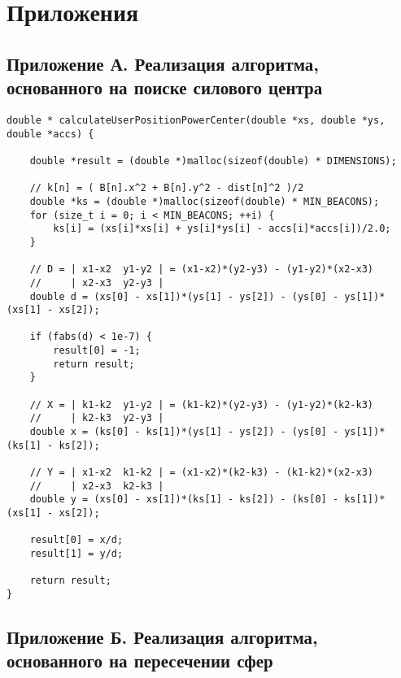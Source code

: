 \section*{Приложения}

\lstset{basicstyle=\footnotesize \ttfamily}
\lstset{language=C, breakindent=40pt, breaklines=true}

\subsection*{Приложение А. Реализация алгоритма, основанного на поиске силового центра}

\begin{lstlisting}
double * calculateUserPositionPowerCenter(double *xs, double *ys, double *accs) {

    double *result = (double *)malloc(sizeof(double) * DIMENSIONS);

    // k[n] = ( B[n].x^2 + B[n].y^2 - dist[n]^2 )/2
    double *ks = (double *)malloc(sizeof(double) * MIN_BEACONS);
    for (size_t i = 0; i < MIN_BEACONS; ++i) {
        ks[i] = (xs[i]*xs[i] + ys[i]*ys[i] - accs[i]*accs[i])/2.0;
    }
    
    // D = | x1-x2  y1-y2 | = (x1-x2)*(y2-y3) - (y1-y2)*(x2-x3)
    //     | x2-x3  y2-y3 |
    double d = (xs[0] - xs[1])*(ys[1] - ys[2]) - (ys[0] - ys[1])*(xs[1] - xs[2]);
    
    if (fabs(d) < 1e-7) {
        result[0] = -1;
        return result;
    }
    
    // X = | k1-k2  y1-y2 | = (k1-k2)*(y2-y3) - (y1-y2)*(k2-k3)
    //     | k2-k3  y2-y3 |
    double x = (ks[0] - ks[1])*(ys[1] - ys[2]) - (ys[0] - ys[1])*(ks[1] - ks[2]);
    
    // Y = | x1-x2  k1-k2 | = (x1-x2)*(k2-k3) - (k1-k2)*(x2-x3)
    //     | x2-x3  k2-k3 |
    double y = (xs[0] - xs[1])*(ks[1] - ks[2]) - (ks[0] - ks[1])*(xs[1] - xs[2]);
    
    result[0] = x/d;
    result[1] = y/d;
    
    return result;
}
\end{lstlisting}

\clearpage \newpage
\subsection*{Приложение Б. Реализация алгоритма, основанного на пересечении сфер}

